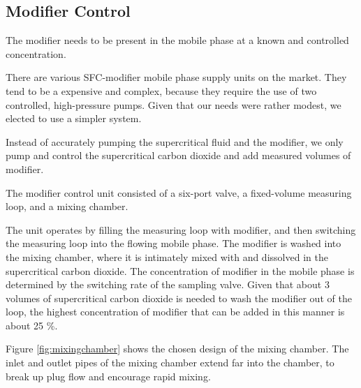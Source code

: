 
\subsection{Modifier Control}

The modifier needs to be present in the mobile phase at a known and controlled
concentration.

There are various SFC-modifier mobile phase supply units on the market. They
tend to be a expensive and complex, because they require the use of two
controlled, high-pressure pumps. Given that our needs were rather modest, we
elected to use a simpler system.

Instead of accurately pumping the supercritical fluid and the modifier, we only
pump and control the supercritical carbon dioxide and add measured volumes of
modifier.

The modifier control unit consisted of a six-port valve, a fixed-volume
measuring loop, and a mixing chamber. 

The unit operates by filling the measuring loop with modifier, and then
switching the measuring loop into the flowing mobile phase. The modifier is
washed into the mixing chamber, where it is intimately mixed with and dissolved
in the supercritical carbon dioxide. The concentration of modifier in the mobile
phase is determined by the switching rate of the sampling valve. Given that
about 3 volumes of supercritical carbon dioxide is needed to wash the modifier
out of the loop, the highest concentration of modifier that can be added in this
manner is about 25 \%.

Figure \ref{fig:mixingchamber} shows the chosen design of the mixing chamber.
The inlet and outlet pipes of the mixing chamber extend far into the chamber, to
break up plug flow and encourage rapid mixing.  

